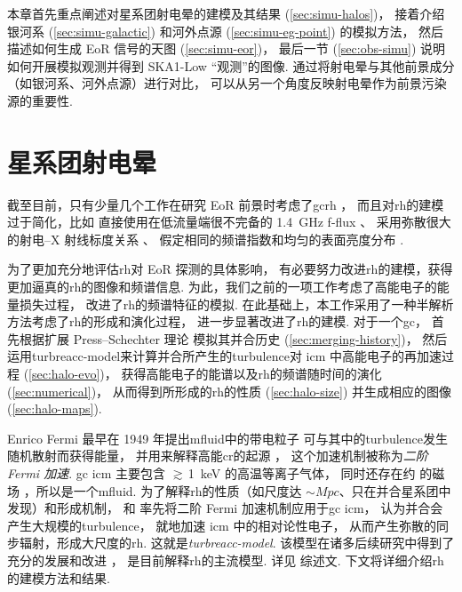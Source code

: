本章首先重点阐述对星系团射电晕的建模及其结果 (\autoref{sec:simu-halos})，
接着介绍银河系 (\autoref{sec:simu-galactic})
和河外点源 (\autoref{sec:simu-eg-point}) 的模拟方法，
然后描述如何生成 EoR 信号的天图 (\autoref{sec:simu-eor})，
最后一节 (\autoref{sec:obs-simu}) 说明如何开展模拟观测并得到
SKA1-Low \enquote{观测}的图像.
通过将射电晕与其他前景成分（如银河系、河外点源）进行对比，
可以从另一个角度反映射电晕作为前景污染源的重要性.


\section{星系团射电晕}
\label{sec:simu-halos}

截至目前，只有少量几个工作在研究 EoR 前景时考虑了\ac{gc}\ac{rh}
\cite{diMatteo2004,gleser2008,jelic2008}，
而且对\ac{rh}的建模过于简化，比如
直接使用在低流量端很不完备的 \SI{1.4}{\GHz} \ac{f-flux} \cite{gleser2008}、
采用弥散很大的射电--X 射线标度关系 \cite{jelic2008}、
假定相同的频谱指数和均匀的表面亮度分布 \cite{gleser2008,jelic2008}.

为了更加充分地评估\ac{rh}对 EoR 探测的具体影响，
有必要努力改进\ac{rh}的建模，获得更加逼真的\ac{rh}的图像和频谱信息.
为此，我们之前的一项工作\cite{wang2010}考虑了高能电子的能量损失过程，
改进了\ac{rh}的频谱特征的模拟.
在此基础上，本工作采用了一种半解析方法考虑了\ac{rh}的形成和演化过程，
进一步显著改进了\ac{rh}的建模.
对于一个\ac{gc}，
首先根据扩展 Press--Schechter 理论
模拟其并合历史 (\autoref{sec:merging-history})，
然后运用\ac{turbreacc-model}来计算并合所产生的\ac{turbulence}对
\ac{icm} 中高能电子的再加速过程 (\autoref{sec:halo-evo})，
获得高能电子的能谱以及\ac{rh}的频谱随时间的演化 (\autoref{sec:numerical})，
从而得到所形成的\ac{rh}的性质 (\autoref{sec:halo-size})
并生成相应的图像 (\autoref{sec:halo-maps}).

Enrico Fermi 最早在 1949 年提出\ac{mfluid}中的带电粒子
可与其中的\ac{turbulence}发生随机散射而获得能量，
并用来解释高能\ac{cr}的起源 \cite{fermi1949,fermi1954,davis1956}，
这个加速机制被称为\emph{二阶 Fermi 加速}.
\ac{gc} \ac{icm} 主要包含 $\gtrsim$\,\SI{1}{\keV} 的高温等离子气体，
同时还存在约 \si{\uG} 的磁场 \cite{govoni2004,ryu2008}，所以是一个\ac{mfluid}.
为了解释\ac{rh}的性质（如尺度达 $\sim\si{Mpc}$、只在并合星系团中发现）和形成机制，
 和 
率先将二阶 Fermi 加速机制应用于\ac{gc} \ac{icm}，
认为并合会产生大规模的\ac{turbulence}，
就地加速 \ac{icm} 中的相对论性电子，
从而产生弥散的同步辐射，形成大尺度的\ac{rh}.
这就是\emph{\ac{turbreacc-model}}.
该模型在诸多后续研究中得到了充分的发展和改进
\cite{fujita2003,brunetti2004,cassano2005,brunetti2007,brunetti2011}，
是目前解释\ac{rh}的主流模型.
详见  综述文.
下文将详细介绍\ac{rh}的建模方法和结果.

